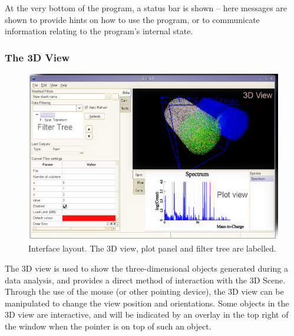 \documentclass[10pt]{article}
\begin{document}
At the very bottom of the program, a status bar is shown -- here messages are shown to provide hints on how to use the program, or to communicate information relating to the program's internal state. 
\subsubsection{The 3D View}
\begin{figure}
 \includegraphics[width=0.65 \textwidth,keepaspectratio=true]{./figures/interface.png}

 \caption{Interface layout. The 3D view, plot panel and filter tree are labelled.}
 \label{fig:interfaceLayout}
\end{figure}
The 3D view is used to show the three-dimensional objects generated during a data analysis, and provides a direct method of interaction with the 3D Scene. Through the use of the mouse (or other pointing device), the 3D view can be manipulated to change the view position and orientations. Some objects in the 3D view are interactive, and will be indicated by an overlay in the top right of the window when the pointer is on top of such an object. 
\end{document}
